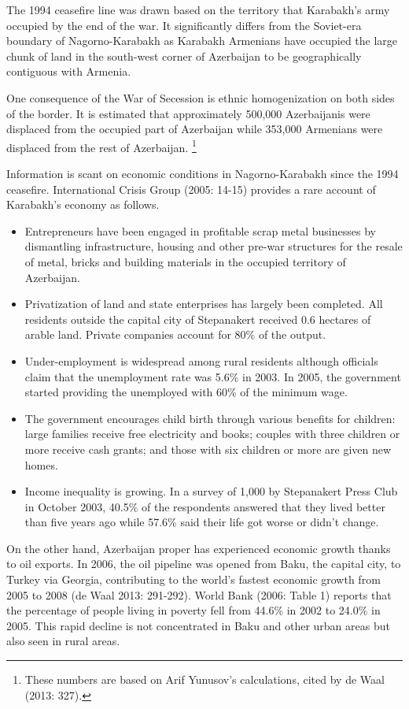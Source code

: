 \documentclass[12pt,a4paper]{article}%
\begin{document}
The 1994 ceasefire line was drawn based on the territory that Karabakh's army occupied by the end of the war. It significantly differs from the Soviet-era boundary of Nagorno-Karabakh as Karabakh Armenians have occupied the large chunk of land in the south-west corner of Azerbaijan to be geographically contiguous with Armenia.

One consequence of the War of Secession is ethnic homogenization on both sides of the border. It is estimated that approximately 500,000 Azerbaijanis were displaced from the occupied part of Azerbaijan while 353,000 Armenians were displaced from the rest of Azerbaijan.%
\footnote{
	These numbers are based on Arif Yunusov's calculations, cited by de Waal (2013: 327).
}

Information is scant on economic conditions in Nagorno-Karabakh since the 1994 ceasefire. 
International Crisis Group (2005: 14-15) provides a rare account of Karabakh's economy as follows. 
\begin{itemize}
\item Entrepreneurs have been engaged in profitable scrap metal businesses by dismantling infrastructure, housing and other pre-war structures for the resale of metal, bricks and building materials in the occupied territory of Azerbaijan.
\item Privatization of land and state enterprises has largely been completed. All residents outside the capital city of Stepanakert received 0.6 hectares of arable land. Private companies account for 80\% of the output. 
\item Under-employment is widespread among rural residents although officials claim that the unemployment rate was 5.6\% in 2003. In 2005, the government started providing the unemployed with 60\% of the minimum wage.
\item The government encourages child birth through various benefits for children: large families receive free electricity and books; couples with three children or more receive cash grants; and those with six children or more are given new homes.
\item Income inequality is growing. In a survey of 1,000 by Stepanakert Press Club in October 2003, 40.5\% of the respondents answered that they lived better than five years ago while 57.6\% said their life got worse or didn't change.
\end{itemize}

On the other hand, Azerbaijan proper has experienced economic growth thanks to oil exports. 
In 2006, the oil pipeline was opened from Baku, the capital city, to Turkey via Georgia, contributing to the world's fastest economic growth from 2005 to 2008 (de Waal 2013: 291-292). 
World Bank (2006: Table 1) reports that the percentage of people living in poverty fell from 44.6\% in 2002 to 24.0\% in 2005.
This rapid decline is not concentrated in Baku and other urban areas but also seen in rural areas.
 
\end{document}
